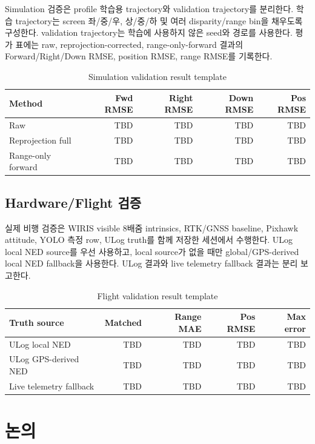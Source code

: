 \documentclass[10pt,conference]{IEEEtran}
\begin{document}
Simulation 검증은 profile 학습용 trajectory와 validation trajectory를 분리한다.
학습 trajectory는 screen 좌/중/우, 상/중/하 및 여러 disparity/range bin을 채우도록 구성한다.
validation trajectory는 학습에 사용하지 않은 seed와 경로를 사용한다.
평가 표에는 raw, reprojection-corrected, range-only-forward 결과의 Forward/Right/Down RMSE, position RMSE, range RMSE를 기록한다.

\begin{table}[t]
\centering
\caption{Simulation validation result template}
\label{tab:simulation_results}
\begin{tabular}{lrrrr}
\toprule
Method & Fwd RMSE & Right RMSE & Down RMSE & Pos RMSE \\
\midrule
Raw & TBD & TBD & TBD & TBD \\
Reprojection full & TBD & TBD & TBD & TBD \\
Range-only forward & TBD & TBD & TBD & TBD \\
\bottomrule
\end{tabular}
\end{table}

\subsection{Hardware/Flight 검증}

실제 비행 검증은 WIRIS visible 8배줌 intrinsics, RTK/GNSS baseline, Pixhawk attitude, YOLO 측정 row, ULog truth를 함께 저장한 세션에서 수행한다.
ULog local NED source를 우선 사용하고, local source가 없을 때만 global/GPS-derived local NED fallback을 사용한다.
ULog 결과와 live telemetry fallback 결과는 분리 보고한다.

\begin{table}[t]
\centering
\caption{Flight validation result template}
\label{tab:flight_results}
\begin{tabular}{lrrrr}
\toprule
Truth source & Matched & Range MAE & Pos RMSE & Max error \\
\midrule
ULog local NED & TBD & TBD & TBD & TBD \\
ULog GPS-derived NED & TBD & TBD & TBD & TBD \\
Live telemetry fallback & TBD & TBD & TBD & TBD \\
\bottomrule
\end{tabular}
\end{table}

\section{논의}
\end{document}
